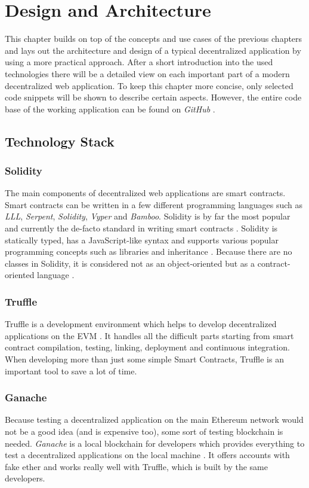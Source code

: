\chapter{Design and Architecture}
\label{cha:DesignArchitecture}

This chapter builds on top of the concepts and use cases of the previous chapters and lays out the architecture and design of a typical decentralized application by using a more practical approach. After a short introduction into the used technologies there will be a detailed view on each important part of a modern decentralized web application. To keep this chapter more concise, only selected code snippets will be shown to describe certain aspects. However, the entire code base of the working application can be found on \textit{GitHub} \cite{CherryPool}.

\section{Technology Stack}
\subsection{Solidity}
The main components of decentralized web applications are smart contracts. Smart contracts can be written in a few different programming languages such as \textit{LLL}, \textit{Serpent}, \textit{Solidity}, \textit{Vyper} and \textit{Bamboo}. Solidity is by far the most popular and currently the de-facto standard in writing smart contracts \cite{AntonopoulosWood2018}. Solidity is statically typed, has a JavaScript-like syntax and supports various popular programming concepts such as libraries and inheritance \cite{SolidityDocumentation}. Because there are no classes in Solidity, it is considered not as an object-oriented but as a contract-oriented language \cite{Solidity}.

\subsection{Truffle}
Truffle is a development environment which helps to develop decentralized applications on the EVM \cite{Truffle}. It handles all the difficult parts starting from smart contract compilation, testing, linking, deployment and continuous integration. When developing more than just some simple Smart Contracts, Truffle is an important tool to save a lot of time.

\subsection{Ganache}
Because testing a decentralized application on the main Ethereum network would not be a good idea (and is expensive too), some sort of testing blockchain is needed. \textit{Ganache} is a local blockchain for developers which provides everything to test a decentralized applications on the local machine \cite{Ganache}. It offers accounts with fake ether and works really well with Truffle, which is built by the same developers.

